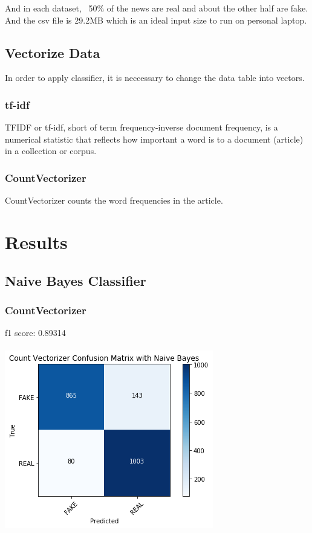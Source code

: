 \documentclass[twoside,twocolumn]{article}
\begin{document}
    \noindent And in each dataset,  ~50\% of the news are real and about the 
    other half are fake. And the csv file is 29.2MB which is an ideal input size 
    to run on personal laptop.
    
    \subsection{Vectorize Data}
    In order to apply classifier, it is neccessary to change the data table into vectors.
    \subsubsection{tf-idf}
    TFIDF or tf-idf, short of term frequency-inverse document frequency, is a numerical statistic that reflects
    how important a word is to a document (article) in a collection or corpus.
    \subsubsection{CountVectorizer}
    CountVectorizer counts the word frequencies in the article.

    \section{Results}
    \subsection{Naive Bayes Classifier}
    \subsubsection{CountVectorizer}
    f1 score: 0.89314\\
    \\ \noindent \includegraphics[scale=0.6]{figures/NBC_count.png}
    
\end{document}
